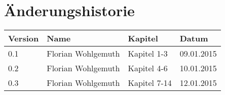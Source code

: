 %
%

\noindent
\chapter*{Änderungshistorie}
\begin{tabularx}{\textwidth}{|l|X|l|l|} \hline
       \textbf{Version}  	& \textbf{Name}   	& \textbf{Kapitel}  & \textbf{Datum}\\ \hline
       0.1           		& Florian Wohlgemuth & Kapitel 1-3 		& 09.01.2015\\\hline
       0.2           		& Florian Wohlgemuth & Kapitel 4-6 		& 10.01.2015\\\hline
       0.3           		& Florian Wohlgemuth & Kapitel 7-14 		& 12.01.2015\\\hline
        
\end{tabularx}